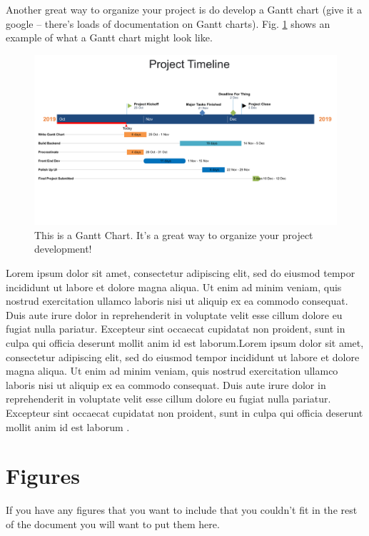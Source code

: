 \documentclass[12pt]{extarticle}
\begin{document}
Another great way to organize your project is do develop a Gantt chart (give it a google -- there's loads of documentation on Gantt charts). Fig. \ref{fig:gantt} shows an example of what a Gantt chart might look like. 

\begin{figure}[!ht]
\centering
  \includegraphics[width={\linewidth}]{img/gantt.png}
  \caption{This is a Gantt Chart. It's a great way to organize your project development!}
  \label{fig:gantt}
\end{figure}

Lorem ipsum dolor sit amet, consectetur adipiscing elit, sed do eiusmod tempor incididunt ut labore et dolore magna aliqua. Ut enim ad minim veniam, quis nostrud exercitation ullamco laboris nisi ut aliquip ex ea commodo consequat. Duis aute irure dolor in reprehenderit in voluptate velit esse cillum dolore eu fugiat nulla pariatur. Excepteur sint occaecat cupidatat non proident, sunt in culpa qui officia deserunt mollit anim id est laborum.Lorem ipsum dolor sit amet, consectetur adipiscing elit, sed do eiusmod tempor incididunt ut labore et dolore magna aliqua. Ut enim ad minim veniam, quis nostrud exercitation ullamco laboris nisi ut aliquip ex ea commodo consequat. Duis aute irure dolor in reprehenderit in voluptate velit esse cillum dolore eu fugiat nulla pariatur. Excepteur sint occaecat cupidatat non proident, sunt in culpa qui officia deserunt mollit anim id est laborum \cite{Linhart2014}.
\newpage 

\appendix
\section{Figures}
If you have any figures that you want to include that you couldn't fit in the rest of the document 
you will want to put them here. 
\end{document}
